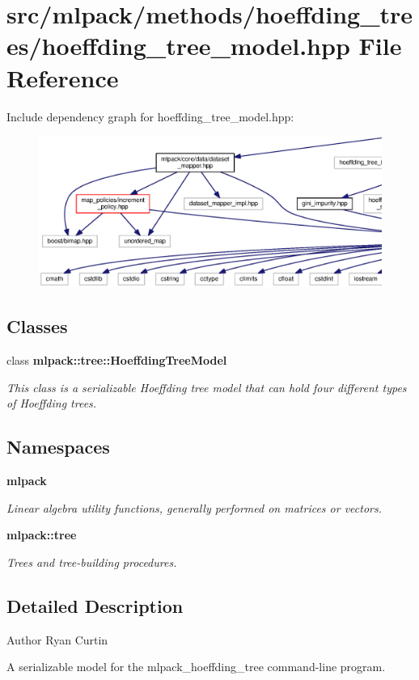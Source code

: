 \section{src/mlpack/methods/hoeffding\+\_\+trees/hoeffding\+\_\+tree\+\_\+model.hpp File Reference}
\label{hoeffding__tree__model_8hpp}
Include dependency graph for hoeffding\+\_\+tree\+\_\+model.\+hpp\+:
\nopagebreak
\begin{figure}[H]
\begin{center}
\leavevmode
\includegraphics[width=350pt]{hoeffding__tree__model_8hpp__incl}
\end{center}
\end{figure}
\subsection*{Classes}
\begin{DoxyCompactItemize}
\item 
class {\bf mlpack\+::tree\+::\+Hoeffding\+Tree\+Model}
\begin{DoxyCompactList}\small\item\em This class is a serializable Hoeffding tree model that can hold four different types of Hoeffding trees. \end{DoxyCompactList}\end{DoxyCompactItemize}
\subsection*{Namespaces}
\begin{DoxyCompactItemize}
\item 
 {\bf mlpack}
\begin{DoxyCompactList}\small\item\em Linear algebra utility functions, generally performed on matrices or vectors. \end{DoxyCompactList}\item 
 {\bf mlpack\+::tree}
\begin{DoxyCompactList}\small\item\em Trees and tree-\/building procedures. \end{DoxyCompactList}\end{DoxyCompactItemize}


\subsection{Detailed Description}
\begin{DoxyAuthor}{Author}
Ryan Curtin
\end{DoxyAuthor}
A serializable model for the mlpack\+\_\+hoeffding\+\_\+tree command-\/line program. 